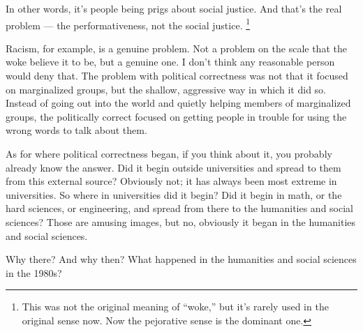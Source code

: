 \documentclass[12pt]{book}
\begin{document}
In other words, it's people being prigs about social justice. And that's
the real problem --- the performativeness, not the social justice.
\footnote{This was not the original meaning of ``woke,'' but it's rarely
used in the original sense now. Now the pejorative sense is the dominant
one.}

Racism, for example, is a genuine problem. Not a problem on the scale
that the woke believe it to be, but a genuine one. I don't think any
reasonable person would deny that. The problem with political
correctness was not that it focused on marginalized groups, but the
shallow, aggressive way in which it did so. Instead of going out into
the world and quietly helping members of marginalized groups, the
politically correct focused on getting people in trouble for using the
wrong words to talk about them.

As for where political correctness began, if you think about it, you
probably already know the answer. Did it begin outside universities and
spread to them from this external source? Obviously not; it has always
been most extreme in universities. So where in universities did it
begin? Did it begin in math, or the hard sciences, or engineering, and
spread from there to the humanities and social sciences? Those are
amusing images, but no, obviously it began in the humanities and social
sciences.

Why there? And why then? What happened in the humanities and social
sciences in the 1980s?
\end{document}
